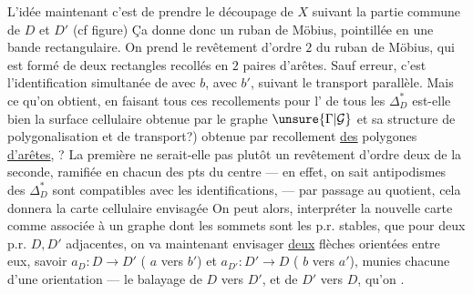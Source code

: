 L'idée maintenant c'est de prendre le découpage de $X$ suivant la partie commune de $D$ et $D'$ (cf figure)
Ça donne donc un ruban de Möbius,   pointillée en une bande rectangulaire. On prend le revêtement   d'ordre $2$ du ruban de Möbius,  qui est formé de deux rectangles recollés en $2$ paires d'arêtes. Sauf erreur, c'est l'identification  simultanée de  avec $b$,   avec $b'$, suivant le transport parallèle. Mais ce qu'on obtient, en faisant tous ces recollements pour l' de tous les $\Delta_D^*$ est-elle bien la surface cellulaire obtenue par le graphe $\unsure{\Gamma|\mathcal G}$ et sa structure de polygonalisation et de transport?) obtenue
par recollement \uline{des} polygones \uline{d'arêtes}, ?  La première ne serait-elle pas plutôt un revêtement d'ordre deux de la seconde, ramifiée en chacun des pts du centre --- en effet, on sait   antipodismes des $\Delta_D^*$ sont compatibles avec les identifications, --- par passage au quotient, cela donnera  la carte cellulaire envisagée\unsure{\ldots} On peut alors,    interpréter la nouvelle carte comme associée à un graphe  dont les sommets sont les p.r. stables, que pour deux p.r. $D,D'$ adjacentes, on va maintenant envisager \uline{deux} flèches orientées entre eux, savoir $a_D:D\longrightarrow D'$ ( $a$ vers $b'$) et $a_{D'}:D'\longrightarrow D$ ( $b$ vers $a'$), munies chacune d'une orientation --- le balayage de $D$ vers $D'$, et de $D'$ vers $D$, qu'on .
